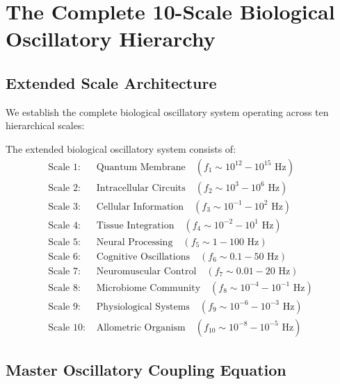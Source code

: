 \documentclass[twocolumn]{article}
\begin{document}
\section{The Complete 10-Scale Biological Oscillatory Hierarchy}

\subsection{Extended Scale Architecture}

We establish the complete biological oscillatory system operating across ten hierarchical scales:

\begin{definition}
The extended biological oscillatory system consists of:
\begin{align}
\text{Scale 1: } &\text{Quantum Membrane} \quad (f_1 \sim 10^{12}-10^{15} \text{ Hz}) \label{eq:quantum_membrane} \\
\text{Scale 2: } &\text{Intracellular Circuits} \quad (f_2 \sim 10^3-10^6 \text{ Hz}) \label{eq:intracellular} \\
\text{Scale 3: } &\text{Cellular Information} \quad (f_3 \sim 10^{-1}-10^2 \text{ Hz}) \label{eq:cellular} \\
\text{Scale 4: } &\text{Tissue Integration} \quad (f_4 \sim 10^{-2}-10^1 \text{ Hz}) \label{eq:tissue} \\
\text{Scale 5: } &\text{Neural Processing} \quad (f_5 \sim 1-100 \text{ Hz}) \label{eq:neural} \\
\text{Scale 6: } &\text{Cognitive Oscillations} \quad (f_6 \sim 0.1-50 \text{ Hz}) \label{eq:cognitive} \\
\text{Scale 7: } &\text{Neuromuscular Control} \quad (f_7 \sim 0.01-20 \text{ Hz}) \label{eq:neuromuscular} \\
\text{Scale 8: } &\text{Microbiome Community} \quad (f_8 \sim 10^{-4}-10^{-1} \text{ Hz}) \label{eq:microbiome} \\
\text{Scale 9: } &\text{Physiological Systems} \quad (f_9 \sim 10^{-6}-10^{-3} \text{ Hz}) \label{eq:physiological} \\
\text{Scale 10: } &\text{Allometric Organism} \quad (f_{10} \sim 10^{-8}-10^{-5} \text{ Hz}) \label{eq:allometric}
\end{align}
\end{definition}

\subsection{Master Oscillatory Coupling Equation}
\end{document}
